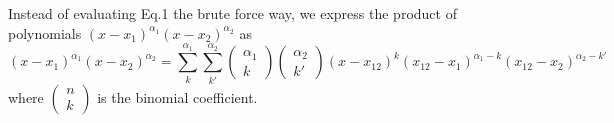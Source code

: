 \documentclass[prb]{revtex4}
\begin{document}
Instead of evaluating Eq.1 the brute force way, we express the product of
polynomials $(x-x_1)^{\alpha_1} (x-x_2)^{\alpha_2}$ as
\begin{equation}
  (x-x_1)^{\alpha_1} (x-x_2)^{\alpha_2} = \sum_{k}^{\alpha_1}\sum_{k'}^{\alpha_2}
  \left(
  \begin{array}{c}
    \alpha_1\\
    k
  \end{array}
  \right)
  \left(
  \begin{array}{c}
    \alpha_2\\
    k'
  \end{array}
  \right)
  (x-x_{12})^k (x_{12} - x_1)^{\alpha_1 - k}  (x_{12} - x_2)^{\alpha_2 - k'}
\end{equation}
where $\left(
\begin{array}{c}
  n\\
  k
\end{array}
\right)$ is the binomial coefficient.
\end{document}
